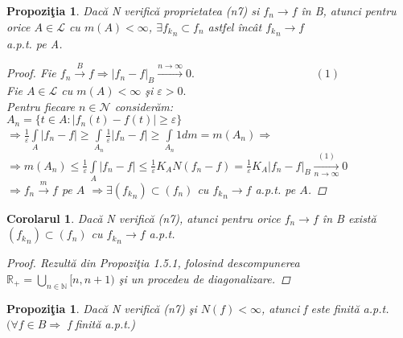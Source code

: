 \documentclass[ a4paper, 12pt]{report}
\newtheorem{prop}[theorem]{\bf Propozi\c tia }
\newtheorem{cor}[theorem]{\bf Corolarul}
\theoremstyle{definition}
\theoremstyle{remark}
\numberwithin{equation}{section}
\begin{document}
\begin{prop}
Dac\u a N verific\u a proprietatea (n7) si $f_n \rightarrow f$ \^in B, atunci pentru orice $A \in \mathcal{L}$ cu $m(A)<\infty$,
$\exists{f_k}_n \subset f_n$ astfel \^inc\^at ${f_k}_n \rightarrow f$ \\a.p.t. pe A.
\begin{proof}
Fie $f_n \xrightarrow{B} f \Rightarrow {\lvert f_n-f \rvert}_B \xrightarrow{n \rightarrow \infty} 0.$ $ \hspace{124pt} (1)$\\
Fie $A \in \mathcal{L}$ cu $m(A)<\infty$ \c si $\varepsilon>0.$\\
Pentru fiecare $n \in \mathcal{N}$ consider\u am:\\
$A_n=\{t \in A : \lvert f_n(t)-f(t) \rvert \geq \varepsilon \}$\\
$\Rightarrow \frac{1}{\varepsilon} \int\limits_{A}^{}{\lvert f_n-f \rvert} \geq  \int\limits_{A_n}^{}{\frac{1}{\varepsilon} \lvert f_n-f \rvert} \geq \int\limits_{A_n}{}{1 dm} = m(A_n) \Rightarrow$ \\ $\Rightarrow m(A_n) \leq \frac{1}{\varepsilon} \int\limits_{A}^{}{\lvert f_n-f \rvert} \leq \frac{1}{\varepsilon} K_A N(f_n-f)=\frac{1}{\varepsilon} K_A {\lvert f_n-f \rvert}_B \xrightarrow[n \rightarrow \infty]{(1)} 0$\\
$\Rightarrow f_	n \xrightarrow{m} f$ pe $A$ $\Rightarrow \exists ({f_k}_n) \subset (f_n)$ cu ${f_k}_n \rightarrow f$ a.p.t. pe $A$.
\end{proof}
\end{prop}
\begin{cor}
Dac\u a N verific\u a (n7), atunci pentru orice $f_n \rightarrow f$ \^in B exist\u a $({f_k}_n) \subset (f_n)$ cu ${f_k}_n \rightarrow f$ a.p.t.
\begin{proof}
Rezult\u a din Propozi\c tia 1.5.1, folosind descompunerea\\ $\mathbb{R_+}=\bigcup\limits_{n \in \mathbb{N}}^{}{[n,n+1)}$ \c si un procedeu de diagonalizare.
\end{proof}
\end{cor}
\newpage
\begin{prop}
Dac\u a N verific\u a (n7) \c si $N(f)<\infty$, atunci f este finit\u a a.p.t. $(\forall f \in B \Rightarrow$ f  finit\u a a.p.t.)
\end{prop}
\end{document}
